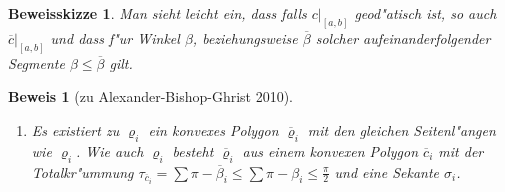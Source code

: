 \documentclass[paper=A4, twoside, chapterprefix=true, bibliography=totoc, headsepline]{scrbook}
\let\temp\phi
\let\phi\varphi
\let\varphi\temp
\let\temp\theta
\let\theta\vartheta
\let\vartheta\temp
\let\temp\epsilon
\let\epsilon\varepsilon
\let\varepsilon\temp
\let\temp\rho
\let\rho\varrho
\let\varrho\temp
\newcommand{\tikzgitter}[3][0.25]{ %
	\draw[step=#1,gray!15] #2 grid #3;
	\draw[step=2*#1,gray!30] #2 grid #3;
	\fill (0,0) circle(0.1); 
}
\theoremstyle{break}
\theoremstyle{nonumberbreak}
\newtheorem{bew}{Beweis}
\newtheorem{bewSkiz}{Beweisskizze}
\theoremstyle{emptybreak}
\theoremstyle{break}
\begin{document}
\begin{bewSkiz}
Man sieht leicht ein, dass falls $c|_{[a,b]}$ geod"atisch ist, so auch $\overline c|_{[a,b]}$ und dass f"ur Winkel $\beta$, beziehungsweise $\overline\beta$ solcher aufeinanderfolgender Segmente $\beta \le \overline\beta$ gilt.
\end{bewSkiz}

\begin{bew}[zu Alexander-Bishop-Ghrist 2010]\begin{enumerate}[label=(\roman*),leftmargin=*,widest=ii]
\item
	Es existiert zu $\rho_i$ ein konvexes Polygon $\overline\rho_i$ mit den gleichen Seitenl"angen wie $\rho_i$.
	Wie auch $\rho_i$ besteht $\overline\rho_i$ aus einem konvexen Polygon $\overline c_i$ mit der Totalkr"ummung $\tau_{\overline c_i} = \sum \pi - \overline\beta_i \le \sum \pi - \beta_i \le \frac{\pi}{2}$ und eine Sekante $\sigma_i$.
	\begin{center}\begin{tikzpicture}[font=\scriptsize,scale=1.0]
		

\end{tikzpicture}
\end{center}
\end{enumerate}
\end{bew}
\end{document}
